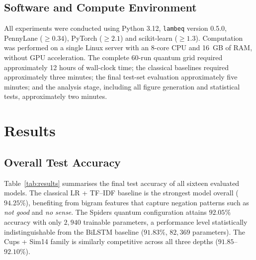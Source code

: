 \documentclass[11pt, a4paper]{article}
\begin{document}
\subsection{Software and Compute Environment}

All experiments were conducted using Python 3.12, \texttt{lambeq}
version 0.5.0, PennyLane (\(\geq 0.34\)), PyTorch (\(\geq 2.1\)) and
scikit-learn (\(\geq 1.3\)). Computation was performed on a single
Linux server with an 8-core CPU and 16~GB of RAM, without GPU
acceleration. The complete 60-run quantum grid required approximately
12 hours of wall-clock time; the classical baselines required
approximately three minutes; the final test-set evaluation
approximately five minutes; and the analysis stage, including all
figure generation and statistical tests, approximately two minutes.

\section{Results}
\label{sec:results}

\subsection{Overall Test Accuracy}

Table~\ref{tab:results} summarises the final test accuracy of all
sixteen evaluated models. The classical LR + TF--IDF baseline is the
strongest model overall (\(94.25\%\)), benefiting from bigram features
that capture negation patterns such as \emph{not good} and
\emph{no sense}. The Spiders quantum configuration attains
\(92.05\%\) accuracy with only \(2{,}940\) trainable parameters, a
performance level statistically indistinguishable from the BiLSTM
baseline (\(91.83\%\), \(82{,}369\) parameters). The Cups + Sim14
family is similarly competitive across all three depths
(\(91.85\)--\(92.10\%\)).
\end{document}
